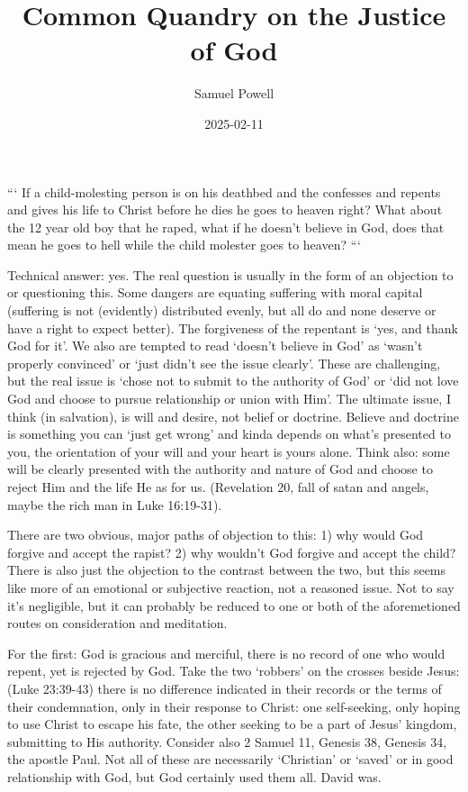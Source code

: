 \documentclass[11pt]{article} %
\title{Common Quandry on the Justice of God}
\author{Samuel Powell}
\date{2025-02-11} %
\begin{document}
\maketitle
```
If a child-molesting person is on his deathbed and the confesses and repents and gives his life to Christ before he dies he goes to heaven right? What about the 12 year old boy that he raped, what if he doesn't believe in God, does that mean he goes to hell while the child molester goes to heaven?
```

Technical answer: yes. The real question is usually in the form of an objection to or questioning this. Some dangers are equating suffering with moral capital (suffering is not (evidently) distributed evenly, but all do and none deserve or have a right to expect better). The forgiveness of the repentant is `yes, and thank God for it'. We also are tempted to read `doesn't believe in God' as `wasn't properly convinced' or `just didn't see the issue clearly'. These are challenging, but the real issue is `chose not to submit to the authority of God' or `did not love God and choose to pursue relationship or union with Him'. The ultimate issue, I think (in salvation), is will and desire, not belief or doctrine. Believe and doctrine is something you can `just get wrong' and kinda depends on what's presented to you, the orientation of your will and your heart is yours alone. Think also: some will be clearly presented with the authority and nature of God and choose to reject Him and the life He as for us. (Revelation 20, fall of satan and angels, maybe the rich man in Luke 16:19-31).

There are two obvious, major paths of objection to this: 1) why would God forgive and accept the rapist? 2) why wouldn't God forgive and accept the child? There is also just the objection to the contrast between the two, but this seems like more of an emotional or subjective reaction, not a reasoned issue. Not to say it's negligible, but it can probably be reduced to one or both of the aforemetioned routes on consideration and meditation. 

For the first: God is gracious and merciful, there is no record of one who would repent, yet is rejected by God. Take the two `robbers' on the crosses beside Jesus: (Luke 23:39-43) there is no difference indicated in their records or the terms of their condemnation, only in their response to Christ: one self-seeking, only hoping to use Christ to escape his fate, the other seeking to be a part of Jesus' kingdom, submitting to His authority. Consider also 2 Samuel 11, Genesis 38, Genesis 34, the apostle Paul. Not all of these are necessarily `Christian' or `saved' or in good relationship with God, but God certainly used them all. David was. 
\end{document}
